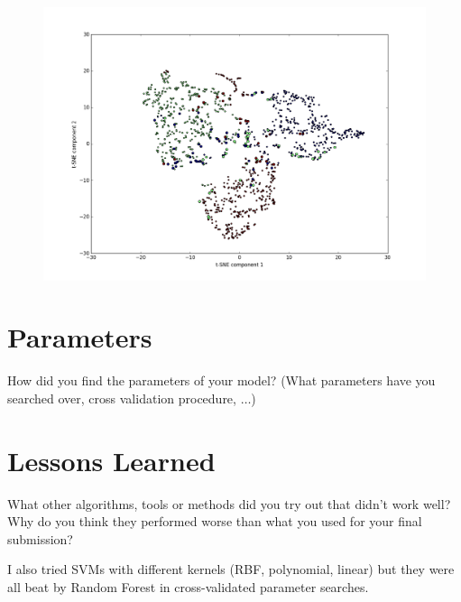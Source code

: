 \documentclass[a4paper, 11pt]{article}
\begin{document}
\begin{figure}[h]
	\label{fig:tsne}
	\begin{center}
	\includegraphics[width=\textwidth]{failures1}
	\end{center}
\end{figure}

\section{Parameters}
How did you find the parameters of your model? (What parameters have you searched over, cross validation procedure, $\ldots$)

\section{Lessons Learned} What other algorithms, tools or methods did you try out that didn't work well?
Why do you think they performed worse than what you used for your final submission?

I also tried SVMs with different kernels (RBF, polynomial, linear) but they were all beat by Random Forest in cross-validated parameter searches.
\end{document}
